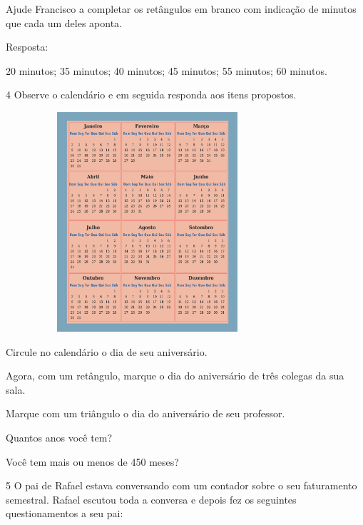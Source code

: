 \begin{escolha}
Ajude Francisco a completar os retângulos em branco com indicação de
minutos que cada um deles aponta.

Resposta:

20 minutos; 35 minutos; 40 minutos; 45 minutos; 55 minutos; 60 minutos.

\num{4} Observe o calendário e em seguida responda aos itens propostos.


\includegraphics[width=4.13369in,height=3.20861in]{media/image54.png}

\begin{escolha}
\item
  Circule no calendário o dia de seu aniversário.

\item
  Agora, com um retângulo, marque o dia do aniversário de três colegas da sua sala.

\item
  Marque com um triângulo o dia do aniversário de seu professor.

\item
  Quantos anos você tem?

\item
  Você tem mais ou menos de 450 meses?
\end{escolha}

\num{5} O pai de Rafael estava conversando com um contador sobre o seu
faturamento semestral. Rafael escutou toda a conversa e depois fez os
seguintes questionamentos a seu pai:


\end{escolha}
